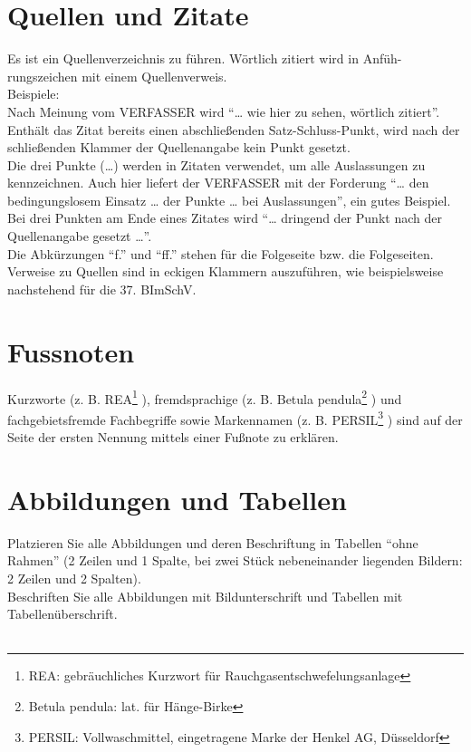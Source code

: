 \section{Quellen und Zitate}
Es ist ein Quellenverzeichnis zu führen. Wörtlich zitiert wird in Anfüh- rungszeichen mit einem Quellenverweis. \\
Beispiele: \\
Nach Meinung vom VERFASSER wird ``… wie hier zu sehen, wörtlich zitiert''.\\
Enthält das Zitat bereits einen abschließenden Satz-Schluss-Punkt, wird nach der schließenden Klammer der Quellenangabe kein Punkt gesetzt. \\
Die drei Punkte (…) werden in Zitaten verwendet, um alle Auslassungen zu kennzeichnen. 
Auch hier liefert der VERFASSER mit der Forderung ``… den bedingungslosem Einsatz … der Punkte … bei Auslassungen'', ein gutes Beispiel. \\
Bei drei Punkten am Ende eines Zitates wird ``… dringend der Punkt nach der Quellenangabe gesetzt …''.\\
Die Abkürzungen ``f.'' und ``ff.'' stehen für die Folgeseite bzw. die Folgeseiten.
Verweise zu Quellen sind in eckigen Klammern auszuführen, wie beispielsweise nachstehend für die 37. BImSchV. \cite{BImSchV}

\section{Fussnoten}
Kurzworte (z. B. REA\footnote{REA: gebräuchliches Kurzwort für Rauchgasentschwefelungsanlage} ), fremdsprachige (z. B. Betula pendula\footnote{Betula pendula: lat. für Hänge-Birke} ) und fachgebietsfremde Fachbegriffe sowie Markennamen (z. B. PERSIL\footnote{PERSIL: Vollwaschmittel, eingetragene Marke der Henkel AG, Düsseldorf} ) sind auf der Seite der ersten Nennung mittels einer Fußnote zu erklären. 

\section{Abbildungen und Tabellen}
Platzieren Sie alle Abbildungen und deren Beschriftung in Tabellen ``ohne Rahmen'' (2 Zeilen und 1 Spalte, bei zwei Stück nebeneinander liegenden Bildern: 2 Zeilen und 2 Spalten). \\
Beschriften Sie alle Abbildungen mit Bildunterschrift und Tabellen mit Tabellenüberschrift. \\
\\

